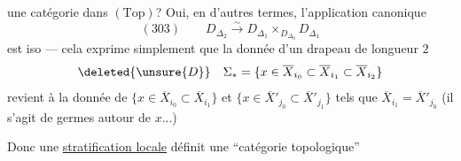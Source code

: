 
une catégorie dans $(\mathrm{Top})$? Oui, en d'autres termes, l'application canonique
\[
(303)\qquad D_{\Delta_2}\xrightarrow{\sim}D_{\Delta_1}\mathbin{\times}_{D_{\Delta_0}}D_{\Delta_1}
\]
est iso --- cela exprime simplement que la donnée d'un drapeau  de longueur $2$
\[
\deleted{\unsure{D}}\quad \Sigma_* = \{x\in\overline X_{i_0}\subset\overline X_{i_1}\subset\overline X_{i_2}\}
\]
revient à la donnée de $\{x\in\overline X_{i_0}\subset\overline X_{i_1}\}$ et $\{x\in\overline X'_{j_0}\subset\overline X'_{j_1}\}$ tels que $\overline X_{i_1}=\overline X'_{j_0}$ (il s'agit de germes autour de $x$...)

Donc une \uline{stratification locale} définit une ``catégorie topologique''
\diagram{
\[
(303)\quad\left\{
\begin{array}{l}
\text{espace des objets} = D_{\Delta_0} \\
\hspace{5em}=\text{espace des strates locales}\\
\hspace{7em}\deleted{\unsure{s}}\ \text{pas strictes}\\[.8em]
\text{espace des flèches} = D_{\Delta_1}\\
\hspace{5em}=\text{espace des drapeaux}\\
\hspace{7em}x\in\overline X_{i_0}\subset\overline X_{i_1}\\[.8em]
\text{\uline{morphismes} ``source'', ``but'', ``\unsure{composition|multiplication}''}\\
\hspace{4em}\text{définis de façon évidente}
\end{array}\right.
\]
}

